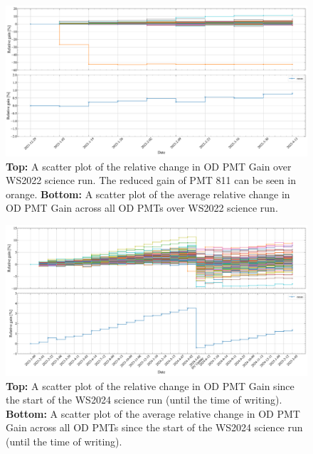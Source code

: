 \begin{figure}
    \centering
    \includegraphics[width=\textwidth]{figures/ODCommissioning/RelativegainOverTime_AllPMTs_Both_Full_WS2022.pdf}
    \caption{\textbf{Top:} A scatter plot of the relative change in OD PMT Gain over WS2022 science run. The reduced gain of PMT 811 can be seen in orange. \textbf{Bottom:} A scatter plot of the average relative change in OD PMT Gain across all OD PMTs over WS2022 science run.}
    \label{fig:RelativeGain_WS2022}
\end{figure}
\begin{figure}
    \centering
    \includegraphics[width=\textwidth]{figures/ODCommissioning/RelativegainOverTime_AllPMTs_Both_Full_WS2024.pdf}
    \caption{\textbf{Top:} A scatter plot of the relative change in OD PMT Gain since the start of the WS2024 science run (until the time of writing). \textbf{Bottom:} A scatter plot of the average relative change in OD PMT Gain across all OD PMTs since the start of the WS2024 science run (until the time of writing).}
    \label{fig:RelativeGain_WS2024}
\end{figure}
